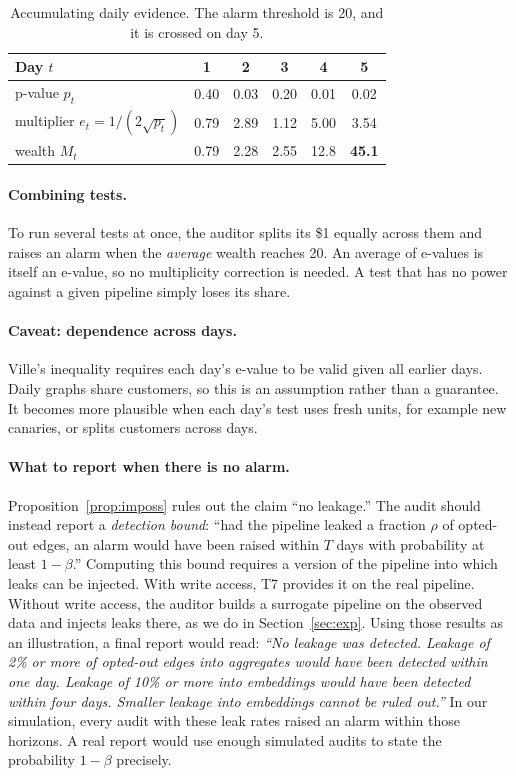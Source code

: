 \documentclass[10pt,twocolumn,letterpaper]{article}
\theoremstyle{definition}
\begin{document}
\begin{table}[t]
\centering\small
\setlength{\tabcolsep}{5pt}
\begin{tabular}{@{}lccccc@{}}
\toprule
Day $t$ & 1 & 2 & 3 & 4 & 5 \\
\midrule
p-value $p_t$ & 0.40 & 0.03 & 0.20 & 0.01 & 0.02 \\
multiplier $e_t=1/(2\sqrt{p_t})$ & 0.79 & 2.89 & 1.12 & 5.00 & 3.54 \\
wealth $M_t$ & 0.79 & 2.28 & 2.55 & 12.8 & \textbf{45.1} \\
\bottomrule
\end{tabular}
\caption{Accumulating daily evidence. The alarm threshold is 20, and it is crossed on day 5.}
\label{tab:evalue}
\end{table}

\paragraph{Combining tests.}
To run several tests at once, the auditor splits its \$1 equally across them
and raises an alarm when the \emph{average} wealth reaches 20. An average of
e-values is itself an e-value, so no multiplicity correction is needed. A test
that has no power against a given pipeline simply loses its share.

\paragraph{Caveat: dependence across days.}
Ville's inequality requires each day's e-value to be valid given all earlier
days. Daily graphs share customers, so this is an assumption rather than a
guarantee. It becomes more plausible when each day's test uses fresh units,
for example new canaries, or splits customers across days.

\paragraph{What to report when there is no alarm.}
Proposition~\ref{prop:imposs} rules out the claim ``no leakage.'' The audit
should instead report a \emph{detection bound}: ``had the pipeline leaked a
fraction $\rho$ of opted-out edges, an alarm would have been raised within $T$
days with probability at least $1-\beta$.'' Computing this bound requires a
version of the pipeline into which leaks can be injected. With write access,
T7 provides it on the real pipeline. Without write access, the auditor builds
a surrogate pipeline on the observed data and injects leaks there, as we do in
Section~\ref{sec:exp}. Using those results as an illustration, a final report
would read: \emph{``No leakage was detected. Leakage of 2\% or more of opted-out
edges into aggregates would have been detected within one day. Leakage of 10\%
or more into embeddings would have been detected within four days. Smaller
leakage into embeddings cannot be ruled out.''} In our simulation, every audit
with these leak rates raised an alarm within those horizons. A real report
would use enough simulated audits to state the probability $1-\beta$ precisely.
\end{document}
